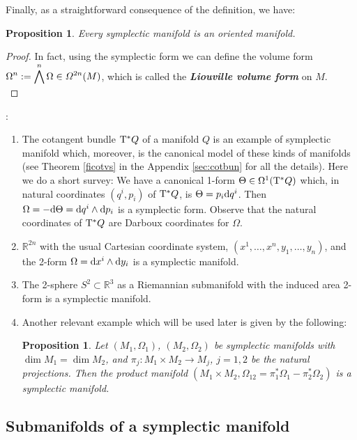 \documentclass[12pt]{report}
\newtheorem{prop}[teor]{Proposition}
\def\dst{\displaystyle}
\def\qed{\ifvmode\removelastskip\fi
{\unskip\nobreak\hfil\penalty50\hbox{}\nobreak\hfil
\hbox{\vrule height1.2ex width1.2ex}\parfillskip=0pt
\finalhyphendemerits=0 \par\smallskip}}
\def\d{{\rm d}}
\def\Real{\mathbb{R}}
\def\Tan{{\rm T}}
\begin{document}
Finally, as a straightforward consequence of the definition, we have:

\begin{prop}
\label{Liouville}
Every symplectic manifold is an {\sl oriented manifold}.
\end{prop}
\begin{proof}
In fact, using the symplectic form we can define the volume form
\(\dst\Omega^n:=\bigwedge^n\Omega \in {\mit\Omega}^{2n}(M)\),
which is called the {\sl \textbf{Liouville volume form}} on $M$.
\\ \qed  \end{proof}

\bigskip
{}:
\begin{enumerate}
\item
The cotangent bundle $\Tan^*Q$ of a manifold $Q$ is an example of symplectic manifold which, moreover, is the canonical model of these kinds of manifolds 
(see Theorem \ref{ficotvs} in the Appendix \ref{sec:cotbun} for all the details). Here we do a short survey:
We have a canonical 1-form $\Theta \in\Omega^1(\Tan^*Q)$ which, in natural coordinates $(q^i,p_i)$ of $\Tan^*Q$, is 
$\Theta=p_i\d q^i$. Then $\Omega=-\d\Theta=\d q^i\wedge\d p_i$ is a symplectic form. 
Observe that the natural coordinates of $\Tan^*Q$ are Darboux coordinates for $\Omega$. 
\item 
$\Real^{2n}$ with the usual Cartesian coordinate system, $(x^{1},\ldots,x^{n},y_{1},\ldots,y_{n})$, and the 2-form $\Omega=\d x^{i}\wedge\d y_{i}$ is a symplectic manifold.
\item 
The 2-sphere $S^{2}\subset \Real^{3}$ as a Riemannian submanifold with the induced  area 2-form is a symplectic manifold.
\item 
Another relevant example which will be used later is given by the following:

\begin{prop}
\label{productsymp}
Let $(M_1,\Omega_1)$, $(M_2,\Omega_2)$ be symplectic manifolds
with $\dim M_1 = \dim M_2$,
and $\pi_j\colon M_1\times M_2\to M_j$, $j=1,2$ be the natural projections.
Then the product manifold $(M_1\times M_2,\Omega_{12}=\pi_1^*\Omega_1-\pi_2^*\Omega_2)$
is a symplectic manifold.
\end{prop}
\end{enumerate}


\subsection{Submanifolds of a symplectic manifold}
\end{document}
